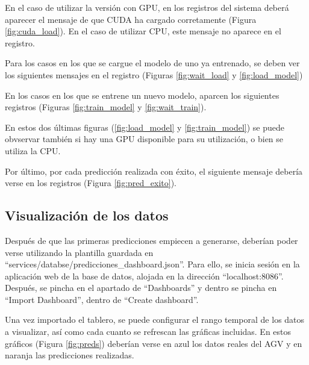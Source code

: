 
En el caso de utilizar la versión con GPU, en los registros del sistema deberá aparecer el mensaje de que CUDA ha 
cargado corretamente (Figura \ref{fig:cuda_load}). En el caso de utilizar CPU, este mensaje no aparece en el 
registro.


Para los casos en los que se cargue el modelo de uno ya entrenado, se deben ver los siguientes mensajes en el registro 
(Figuras \ref{fig:wait_load} y \ref{fig:load_model})


En los casos en los que se entrene un nuevo modelo, aparcen los siguientes registros (Figuras \ref{fig:train_model} y \ref{fig:wait_train}).


En estos dos últimas figuras (\ref{fig:load_model} y \ref{fig:train_model}) se puede obvservar también si hay 
una GPU disponible para su utilización, o bien se utiliza la CPU.

Por último, por cada predicción realizada con éxito, el siguiente mensaje debería verse en los registros (Figura \ref{fig:pred_exito}).


\subsection{Visualización de los datos}

Después de que las primeras predicciones empiecen a generarse, deberían poder verse utilizando la plantilla guardada en
``services/databse/predicciones\_dashboard.json''. Para ello, se inicia sesión en la aplicación web de la base de 
datos, alojada en la dirección ``localhost:8086''. Después, se pincha en el apartado de ``Dashboards'' y dentro se 
pincha en ``Import Dashboard'', dentro de ``Create dashboard''.

Una vez importado el tablero, se puede configurar el rango temporal de los datos a visualizar, así como cada cuanto 
se refrescan las gráficas incluidas. En estos gráficos (Figura \ref{fig:preds}) deberían verse en azul los datos reales 
del AGV y en naranja las predicciones realizadas.

